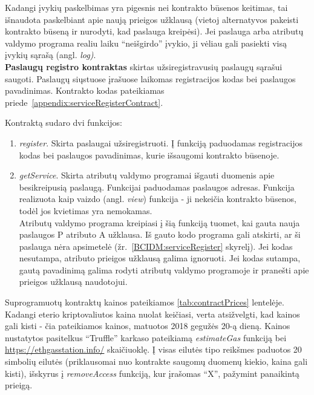 Kadangi įvykių paskelbimas yra pigesnis nei kontrakto būsenos keitimas, tai išnaudota paskelbiant apie naują prieigos užklausą (vietoj alternatyvos pakeisti
kontrakto būseną ir nurodyti, kad paslauga kreipėsi). Jei paslauga arba atributų valdymo programa realiu laiku \enquote{neišgirdo} įvykio, ji vėliau gali
pasiekti visą įvykių sąrašą (angl. \textit{log)}.\\

\textbf{Paslaugų registro kontraktas} skirtas užsiregistravusių paslaugų sąrašui saugoti. Paslaugų siųstuose įrašuose laikomas
registracijos kodas bei paslaugos pavadinimas.
Kontrakto kodas pateikiamas priede\hypertarget{appendix:serviceRegisterContract}{~\ref{appendix:serviceRegisterContract}}.

Kontraktą sudaro dvi funkcijos:

\begin{enumerate}
    \item \textit{register}. Skirta paslaugai užsiregistruoti. Į funkciją paduodamas registracijos kodas bei paslaugos pavadinimas, kurie išsaugomi kontrakto būsenoje.
    \item \textit{getService}. Skirta atributų valdymo programai išgauti duomenis apie besikreipusią paslaugą. Funkcijai paduodamas paslaugos adresas.
    Funkcija realizuota kaip vaizdo (angl. \textit{view}) funkcija - ji nekeičia kontrakto būsenos, todėl jos kvietimas yra nemokamas. \\ 
    Atributų valdymo programa kreipiasi į šią funkciją tuomet, kai gauta nauja paslaugos P atributo A užklausa.
    Iš gauto kodo programa gali atskirti, ar ši paslauga nėra apsimetelė
    (žr.\hypertarget{BCIDM:serviceRegister}{~\ref{BCIDM:serviceRegister} skyrelį}). Jei kodas nesutampa, atributo prieigos užklausą galima ignoruoti. Jei kodas sutampa,
    gautą pavadinimą galima rodyti atributų valdymo programoje ir pranešti apie prieigos užklausą naudotojui.
\end{enumerate}

Suprogramuotų kontraktų kainos pateikiamos \hypertarget{tab:contractPrices}{\ref{tab:contractPrices}} lentelėje. Kadangi eterio kriptovaliutos kaina
nuolat keičiasi, verta atsižvelgti, kad kainos gali kisti - čia pateikiamos kainos, matuotos 2018 gegužės 20-ą dieną. Kainos nustatytos
pasitelkus \enquote{Truffle} karkaso pateikiamą \textit{estimateGas} funkciją bei \url{https://ethgasstation.info/} skaičiuoklę.
Į visas eilutės tipo reikšmes paduotos 20 simbolių eilutės (priklausomai nuo kontrakte saugomų duomenų kiekio, kaina gali kisti), išskyrus
į \textit{removeAccess} funkciją, kur įrašomas \enquote{X}, pažymint panaikintą prieigą.

